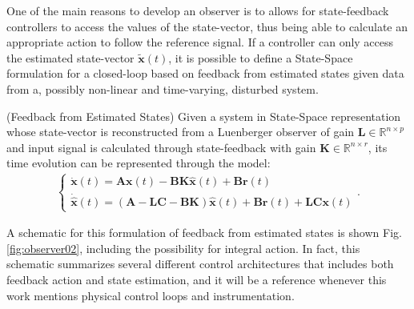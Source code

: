\documentclass[a4paper,11pt]{book}
\numberwithin{figure}{chapter}
\numberwithin{equation}{chapter}
\numberwithin{table}{chapter}
\theoremstyle{definition}
\newtheorem{definition}{Definition}[chapter]
\newcounter{boxed-theorem}
\newcounter{boxed-definition}
\newenvironment{boxed-definition}[1]
{\begin{shaded} \begin{definition}{#1}}
{\end{definition} \end{shaded}}
\begin{document}
One of the main reasons to develop an observer is to allows for state-feedback controllers to access the values of the state-vector, thus being able to calculate an appropriate action to follow the reference signal. If a controller can only access the estimated state-vector $\tilde{\bm{x}}(t)$, it is possible to define a State-Space formulation for a closed-loop based on feedback from estimated states given data from a, possibly non-linear and time-varying, disturbed system.

\begin{boxed-definition}{(Feedback from Estimated States)} \label{def:fdbckLuenberger}
    Given a system in State-Space representation whose state-vector is reconstructed from a Luenberger observer of gain $\bm{L} \in \mathbb{R}^{n \times p}$ and input signal is calculated through state-feedback with gain $\bm{K} \in \mathbb{R}^{n \times r}$, its time evolution can be represented through the model:
    \begin{align} \label{eq:fdbckLuenberger01}
    \begin{cases}
        \dot{\bm{x}}(t) = \bm{A} \bm{x}(t) - \bm{B} \bm{K} \hat{\bm{x}}(t) + \bm{B} \bm{r}(t) \\
        \dot{\hat{\bm{x}}}(t) = \left(\bm{A} - \bm{L} \bm{C} - \bm{B} \bm{K} \right) \hat{\bm{x}}(t) + \bm{B} \bm{r}(t) + \bm{L} \bm{C} \bm{x}(t) 
    \end{cases}
    .\end{align}
\end{boxed-definition} 

A schematic for this formulation of feedback from estimated states is shown Fig. \ref{fig:observer02}, including the possibility for integral action. In fact, this schematic summarizes several different control architectures that includes both feedback action and state estimation, and it will be a reference whenever this work mentions physical control loops and instrumentation.
\end{document}
